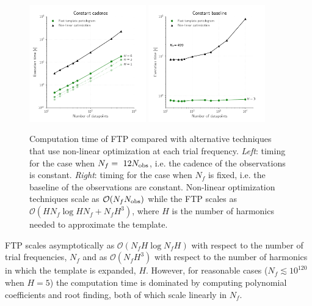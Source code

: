 \documentclass{aastex62}
\newcommand{\bigO}{\mathcal{O}}
\begin{document}
\begin{figure}
    \centering
    \includegraphics[width=0.45\textwidth]{timing_vs_ndata.pdf}
    \includegraphics[width=0.45\textwidth]{timing_vs_ndata_const_freq.pdf}
    \caption{\label{fig:timingndata} Computation time of FTP compared with alternative techniques
             that use non-linear optimization at each trial frequency. \emph{Left}: timing for the
             case when $N_f = ~12 N_{\rm obs}$, i.e. the cadence of the observations is constant.
             \emph{Right}: timing for the case when $N_f$ is fixed, i.e. the baseline of the observations
             are constant. Non-linear optimization techniques scale as $\bigO(N_f N_{\rm obs})$ while
             the FTP scales as $\bigO(HN_f\log HN_f + N_fH^3)$, where $H$ is the number of harmonics
             needed to approximate the template.}

\end{figure}

FTP scales asymptotically as $\bigO(N_fH\log N_fH)$ with respect to the number of trial frequencies,
$N_f$ and as $\bigO(N_fH^3)$ with respect to the number of harmonics in which the template is expanded, $H$.
However, for reasonable cases ($N_f \lesssim 10^{120}$ when $H=5$) the computation time is dominated by
computing polynomial coefficients and root finding, both of which scale linearly in $N_f$.
\end{document}
